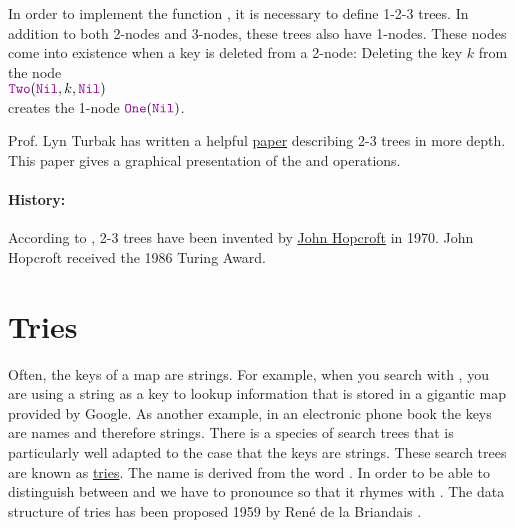 \begin{enumerate}[(a)]
      In order to implement the function , it is necessary to define 1-2-3 trees.
      In addition to both 2-nodes and 3-nodes, these trees also have 1-nodes.  These nodes come into existence
      when a key is deleted from a 2-node:  Deleting the key $k$ from the node
      \\[0.2cm]
      \hspace*{1.3cm}
      $\mytt{Two}(\mytt{Nil}, k, \mytt{Nil})$
      \\[0.2cm]
      creates the 1-node $\mytt{One}(\mytt{Nil})$.
\end{enumerate}
Prof. Lyn Turbak has written a helpful
\href{http://www.cs.princeton.edu/~dpw/courses/cos326-12/ass/2-3-trees.pdf}{paper} describing 2-3 trees in more
depth.  This paper gives a graphical presentation of the  and  operations.

\paragraph{History:}
According to \cite{cormen:09}, 2-3 trees have been invented by
\href{https://en.wikipedia.org/wiki/John_Hopcroft}{John Hopcroft} in 1970.  John Hopcroft received the 1986
Turing Award. 



\section{Tries}
Often, the keys of a map are strings.  For example, when you search with 
\href{https://www.google.com}{}, you are using
a string as a key to lookup information that is stored in a gigantic map provided by Google.
As another example, in an electronic phone book the keys are names and therefore strings.  
There is a species of search trees that is particularly well adapted to the case that the keys are
strings.  These search trees are known as \href{https://en.wikipedia.org/?title=Trie}{tries}.  
The name is derived from the word
.  In order to be able to distinguish between  and
 we have to pronounce    so that it rhymes with .   The data
structure of tries has been proposed 1959 by Ren\'e de la Briandais \cite{briandais:59}.

